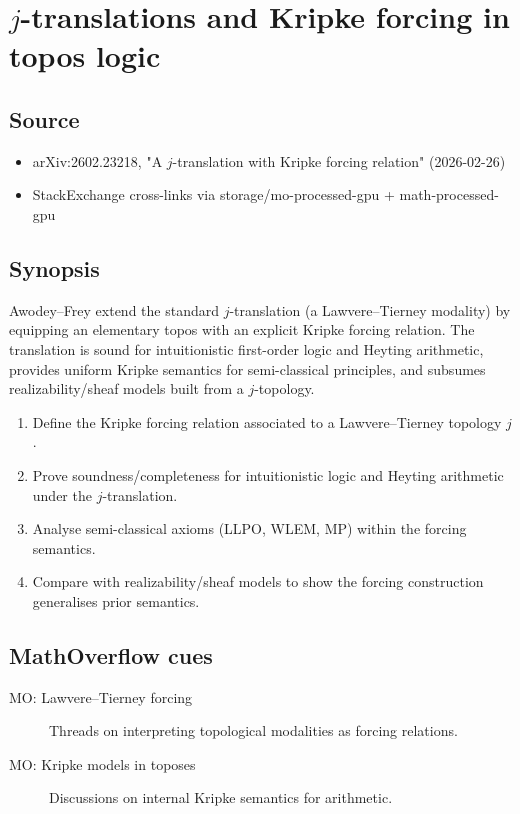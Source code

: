 \section*{$j$-translations and Kripke forcing in topos logic}
\subsection*{Source}
\begin{itemize}
  \item arXiv:2602.23218, "A $j$-translation with Kripke forcing relation" (2026-02-26)
  \item StackExchange cross-links via storage/mo-processed-gpu + math-processed-gpu
\end{itemize}
\subsection*{Synopsis}
Awodey--Frey extend the standard $j$-translation (a Lawvere--Tierney modality) by equipping an elementary topos with an explicit Kripke forcing relation. The translation is sound for intuitionistic first-order logic and Heyting arithmetic, provides uniform Kripke semantics for semi-classical principles, and subsumes realizability/sheaf models built from a $j$-topology.
\begin{enumerate}
  \item Define the Kripke forcing relation associated to a Lawvere--Tierney topology $j$.
  \item Prove soundness/completeness for intuitionistic logic and Heyting arithmetic under the $j$-translation.
  \item Analyse semi-classical axioms (LLPO, WLEM, MP) within the forcing semantics.
  \item Compare with realizability/sheaf models to show the forcing construction generalises prior semantics.
\end{enumerate}
\subsection*{MathOverflow cues}
\begin{description}
  \item[MO: Lawvere--Tierney forcing] Threads on interpreting topological modalities as forcing relations.
  \item[MO: Kripke models in toposes] Discussions on internal Kripke semantics for arithmetic.
\end{description}
